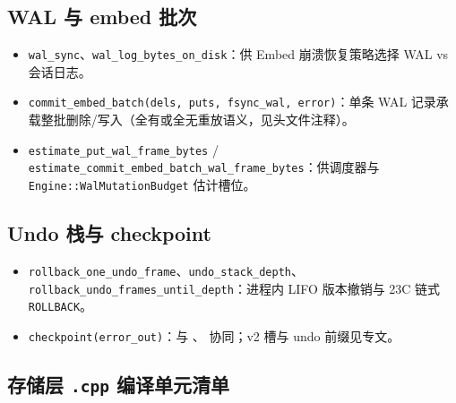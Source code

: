\subsection{WAL 与 embed 批次}

\begin{itemize}
  \item \texttt{wal\_sync}、\texttt{wal\_log\_bytes\_on\_disk}：供 Embed 崩溃恢复策略选择 WAL vs 会话日志。
  \item \texttt{commit\_embed\_batch(dels, puts, fsync\_wal, error)}：单条 WAL 记录承载整批删除/写入（全有或全无重放语义，见头文件注释）。
  \item \texttt{estimate\_put\_wal\_frame\_bytes} / \texttt{estimate\_commit\_embed\_batch\_wal\_frame\_bytes}：供调度器与 \texttt{Engine::WalMutationBudget} 估计槽位。
\end{itemize}

\subsection{Undo 栈与 checkpoint}

\begin{itemize}
  \item \texttt{rollback\_one\_undo\_frame}、\texttt{undo\_stack\_depth}、\texttt{rollback\_undo\_frames\_until\_depth}：进程内 LIFO 版本撤销与 23C 链式 \texttt{ROLLBACK}。
  \item \texttt{checkpoint(error\_out)}：与 、 协同；v2 槽与 undo 前缀见专文。
\end{itemize}

\subsection{存储层 \texttt{.cpp} 编译单元清单}

